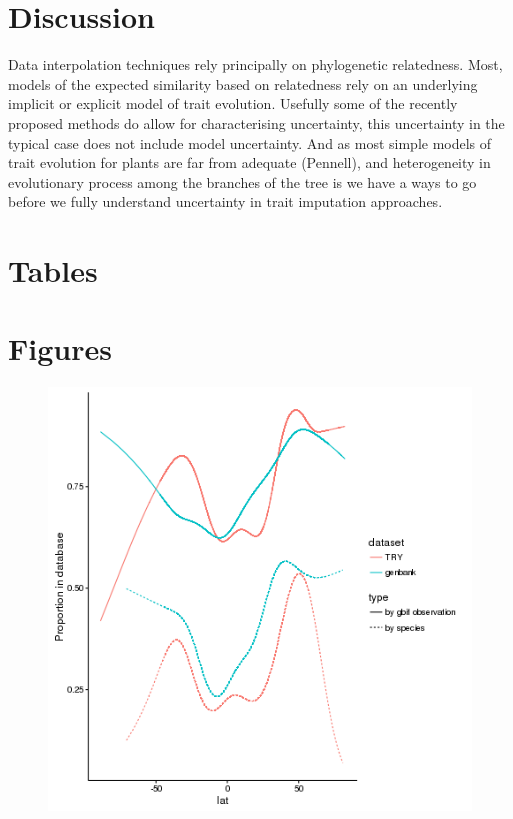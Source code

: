 \documentclass[a4paper,11pt]{article}
\begin{document}
\section{Discussion}




Data interpolation techniques rely principally on phylogenetic relatedness.  
Most, models of the expected similarity based on relatedness rely on an underlying implicit or explicit model of trait evolution.  
Usefully some of the recently proposed methods do allow for characterising uncertainty, this uncertainty in the typical case
does not include model uncertainty.  And as most simple models of trait evolution for plants are far from adequate (Pennell), and heterogeneity in evolutionary 
process among the branches of the tree is 
we have a ways to go before we fully understand uncertainty in trait imputation approaches.   

\section{Tables}









\section{Figures}

\begin{figure}[h!]
\centering
  \includegraphics[width=\textwidth]{figures/multi_gam.png}
\end{figure}
\end{document}
